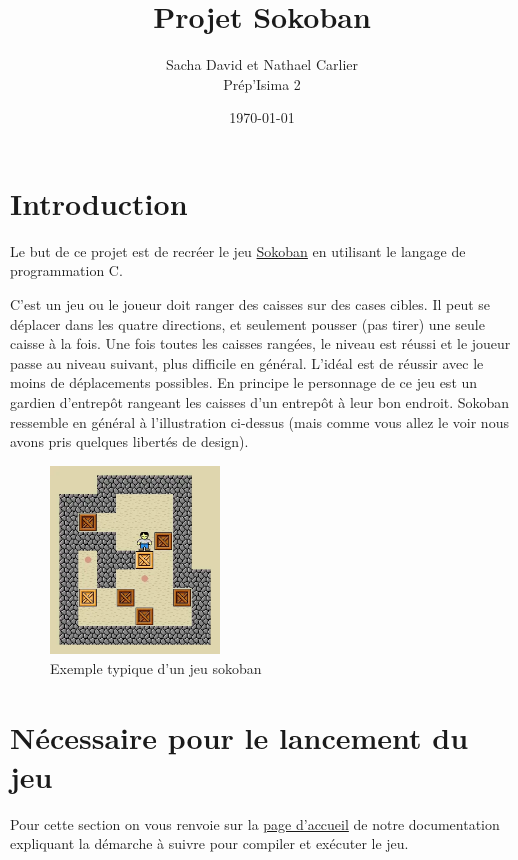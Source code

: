 \documentclass[french, 12pt]{article}
\title{Projet Sokoban}
\author{Sacha David et Nathael Carlier\\
       Prép'Isima 2}
\date{\today}
\begin{document}
\maketitle


\tableofcontents


\section{Introduction}


   Le but de ce projet est de recréer le jeu \href{https://fr.wikipedia.org/wiki/Sokoban}{Sokoban} en utilisant le langage de programmation C.


   C'est un jeu ou le joueur doit ranger des caisses sur des cases cibles. Il peut se déplacer dans les quatre directions, et seulement pousser (pas tirer) une seule caisse à la fois. Une fois toutes les caisses rangées, le niveau est réussi et le joueur passe au niveau suivant, plus difficile en général. L'idéal est de réussir avec le moins de déplacements possibles. En principe le personnage de ce jeu est un gardien d'entrepôt rangeant les caisses d'un entrepôt à leur bon endroit. Sokoban ressemble en général à l'illustration ci-dessus (mais comme vous allez le voir nous avons pris quelques libertés de design).


   \begin{figure}[h]
       \centering
       \includegraphics[width=0.4\textwidth]{illustration/base_sokoban.png}
       \caption{Exemple typique d'un jeu sokoban}
   \end{figure}


\section{Nécessaire pour le lancement du jeu}


Pour cette section on vous renvoie sur la \href{../doc/redirect.html}{page d'accueil} de notre documentation expliquant la démarche à suivre pour compiler et exécuter le jeu.
\end{document}
